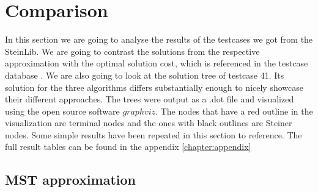 
\chapter{Comparison}\label{chapter:04_comparison}

In this section we are going to analyse the results of the testcases we got from the SteinLib. We are going to contrast the solutions from the respective approximation with the optimal solution cost, which is referenced in the testcase database \cite{Dui93}. We are also going to look at the solution tree of testcase 41. Its solution for the three algorithms differs substantially enough to nicely showcase their different approaches. The trees were output as a .dot file and visualized using the open source software $graphviz$. The nodes that have a red outline in the visualization are terminal nodes and the ones with black outlines are Steiner nodes. Some simple results have been repeated in this section to reference. The full result tables can be found in the appendix \ref{chapter:appendix}

\section{MST approximation}

